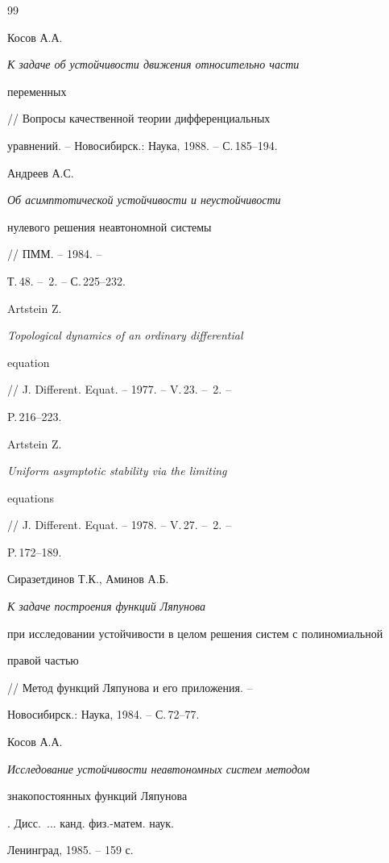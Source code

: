 \begin{thebibliography}{99}


Косов А.А. {\em К задаче об устойчивости движения относительно части 


переменных} // Вопросы качественной теории дифференциальных 


уравнений. -- Новосибирск.: Наука, 1988. -- С.\,185--194. 


 




Андреев А.С. {\em Об асимптотической устойчивости и неустойчивости 


нулевого решения неавтономной системы} // ПММ. -- 1984. -- 


Т.\,48. -- \No\,2. -- С.\,225--232. 


 




Artstein Z. {\em Topological dynamics of an ordinary differential 


equation} // J. Different. Equat. -- 1977. -- V.\,23. -- \No\,2. -- 


P.\,216--223. 


 




Artstein Z. {\em Uniform asymptotic stability via the limiting 


equations} // J. Different. Equat. -- 1978. -- V.\,27. -- \No\,2. -- 


P.\,172--189. 


 




Сиразетдинов Т.К., Аминов А.Б. {\em К задаче построения функций Ляпунова 


при исследовании устойчивости в целом решения систем с полиномиальной 


правой частью} // Метод функций Ляпунова и его приложения. -- 


Новосибирск.: Наука, 1984. -- С.\,72--77. 


 




Косов А.А. {\em Исследование устойчивости неавтономных систем методом 


знакопостоянных функций Ляпунова}. Дисс.~$\dots$ канд. физ.-матем. наук. 


Ленинград, 1985. -- 159 с. 



\end{thebibliography}
